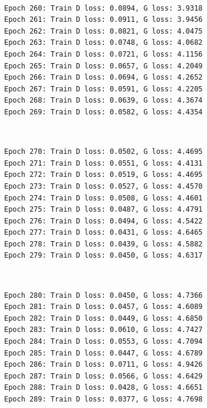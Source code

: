 \documentclass[11pt]{article}
\begin{document}
    \begin{center}
    \end{center}
    { \hspace*{\fill} \\}
    
    \begin{Verbatim}[commandchars=\\\{\}]
Epoch 260: Train D loss: 0.0894, G loss: 3.9318
Epoch 261: Train D loss: 0.0911, G loss: 3.9456
Epoch 262: Train D loss: 0.0821, G loss: 4.0475
Epoch 263: Train D loss: 0.0748, G loss: 4.0682
Epoch 264: Train D loss: 0.0721, G loss: 4.1156
Epoch 265: Train D loss: 0.0657, G loss: 4.2049
Epoch 266: Train D loss: 0.0694, G loss: 4.2652
Epoch 267: Train D loss: 0.0591, G loss: 4.2205
Epoch 268: Train D loss: 0.0639, G loss: 4.3674
Epoch 269: Train D loss: 0.0582, G loss: 4.4354

    \end{Verbatim}

    \begin{center}
    \end{center}
    { \hspace*{\fill} \\}
    
    \begin{Verbatim}[commandchars=\\\{\}]
Epoch 270: Train D loss: 0.0502, G loss: 4.4695
Epoch 271: Train D loss: 0.0551, G loss: 4.4131
Epoch 272: Train D loss: 0.0519, G loss: 4.4695
Epoch 273: Train D loss: 0.0527, G loss: 4.4570
Epoch 274: Train D loss: 0.0508, G loss: 4.4601
Epoch 275: Train D loss: 0.0487, G loss: 4.4791
Epoch 276: Train D loss: 0.0494, G loss: 4.5422
Epoch 277: Train D loss: 0.0431, G loss: 4.6465
Epoch 278: Train D loss: 0.0439, G loss: 4.5882
Epoch 279: Train D loss: 0.0450, G loss: 4.6317

    \end{Verbatim}

    \begin{center}
    \end{center}
    { \hspace*{\fill} \\}
    
    \begin{Verbatim}[commandchars=\\\{\}]
Epoch 280: Train D loss: 0.0450, G loss: 4.7366
Epoch 281: Train D loss: 0.0457, G loss: 4.6089
Epoch 282: Train D loss: 0.0449, G loss: 4.6850
Epoch 283: Train D loss: 0.0610, G loss: 4.7427
Epoch 284: Train D loss: 0.0553, G loss: 4.7094
Epoch 285: Train D loss: 0.0447, G loss: 4.6789
Epoch 286: Train D loss: 0.0711, G loss: 4.9426
Epoch 287: Train D loss: 0.0566, G loss: 4.6429
Epoch 288: Train D loss: 0.0428, G loss: 4.6651
Epoch 289: Train D loss: 0.0377, G loss: 4.7698

    \end{Verbatim}
\end{document}
